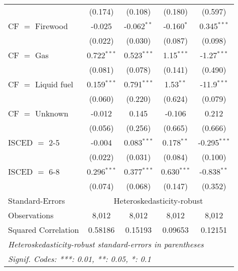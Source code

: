 \begin{table}[htbp!]
\begin{adjustbox}{width = 1\textwidth, max height = 0.95\textheight, center}
\begin{threeparttable}[b]
\begin{tabular}{lcccc}
                                 & (0.174)            & (0.108)            & (0.180)       & (0.597)\\   
            CF $=$ Firewood      & -0.025             & -0.062$^{**}$      & -0.160$^{*}$  & 0.345$^{***}$\\   
                                 & (0.022)            & (0.030)            & (0.087)       & (0.098)\\   
            CF $=$ Gas           & 0.722$^{***}$      & 0.523$^{***}$      & 1.15$^{***}$  & -1.27$^{***}$\\   
                                 & (0.081)            & (0.078)            & (0.141)       & (0.490)\\   
            CF $=$ Liquid fuel   & 0.159$^{***}$      & 0.791$^{***}$      & 1.53$^{**}$   & -11.9$^{***}$\\   
                                 & (0.060)            & (0.220)            & (0.624)       & (0.079)\\   
            CF $=$ Unknown       & -0.012             & 0.145              & -0.106        & 0.212\\   
                                 & (0.056)            & (0.256)            & (0.665)       & (0.666)\\   
            ISCED $=$ 2-5        & -0.004             & 0.083$^{***}$      & 0.178$^{**}$  & -0.295$^{***}$\\   
                                 & (0.022)            & (0.031)            & (0.084)       & (0.100)\\   
            ISCED $=$ 6-8        & 0.296$^{***}$      & 0.377$^{***}$      & 0.630$^{***}$ & -0.838$^{**}$\\   
                                 & (0.074)            & (0.068)            & (0.147)       & (0.352)\\   
            \midrule 
            Standard-Errors & \multicolumn{4}{c}{Heteroskedasticity-robust} \\ 
            Observations         & 8,012              & 8,012              & 8,012         & 8,012\\  
            Squared Correlation  & 0.58186            & 0.15193            & 0.09653       & 0.12151\\  
            \midrule \midrule
            \multicolumn{5}{l}{\emph{Heteroskedasticity-robust standard-errors in parentheses}}\\
            \multicolumn{5}{l}{\emph{Signif. Codes: ***: 0.01, **: 0.05, *: 0.1}}\\
         \end{tabular}
         

\end{threeparttable}
\end{adjustbox}
\end{table}
